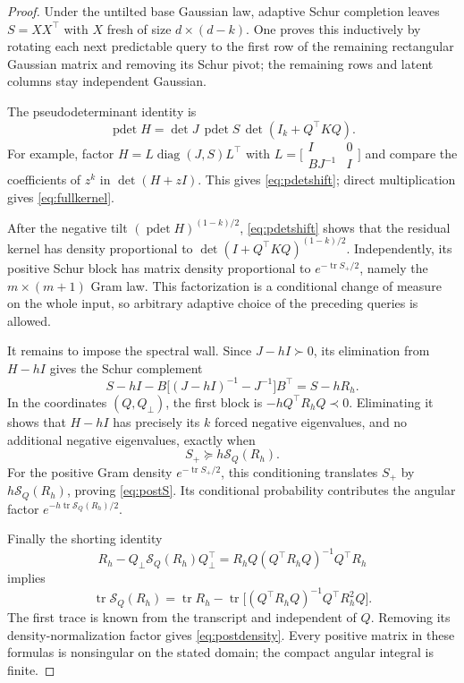 \documentclass[11pt]{article}
\theoremstyle{definition}
\newcommand{\tr}{\operatorname{tr}}
\newcommand{\diag}{\operatorname{diag}}
\newcommand{\pdet}{\operatorname{pdet}}
\begin{document}
\begin{proof}
Under the untilted base Gaussian law, adaptive Schur completion leaves $S=XX^\top$ with $X$ fresh of size $d\times(d-k)$. One proves this inductively by rotating each next predictable query to the first row of the remaining rectangular Gaussian matrix and removing its Schur pivot; the remaining rows and latent columns stay independent Gaussian.

The pseudodeterminant identity is
\begin{equation}\label{eq:pdetshift}
\pdet H=\det J\,\pdet S\,\det(I_k+Q^\top KQ).
\end{equation}
For example, factor $H=L\diag(J,S)L^\top$ with
$L=\bigl[\begin{smallmatrix}I&0\\BJ^{-1}&I\end{smallmatrix}\bigr]$ and compare the coefficients of $z^k$ in $\det(H+zI)$. This gives \eqref{eq:pdetshift}; direct multiplication gives \eqref{eq:fullkernel}.

After the negative tilt $(\pdet H)^{(1-k)/2}$, \eqref{eq:pdetshift} shows that the residual kernel has density proportional to $\det(I+Q^\top KQ)^{(1-k)/2}$. Independently, its positive Schur block has matrix density proportional to $e^{-\tr S_+/2}$, namely the $m\times(m+1)$ Gram law. This factorization is a conditional change of measure on the whole input, so arbitrary adaptive choice of the preceding queries is allowed.

It remains to impose the spectral wall. Since $J-hI\succ0$, its elimination from $H-hI$ gives the Schur complement
\[
S-hI-B\big[(J-hI)^{-1}-J^{-1}\big]B^\top=S-hR_h.
\]
In the coordinates $(Q,Q_\perp)$, the first block is $-hQ^\top R_hQ\prec0$. Eliminating it shows that $H-hI$ has precisely its $k$ forced negative eigenvalues, and no additional negative eigenvalues, exactly when
\[
S_+\succeq h\mathcal S_Q(R_h).
\]
For the positive Gram density $e^{-\tr S_+/2}$, this conditioning translates $S_+$ by $h\mathcal S_Q(R_h)$, proving \eqref{eq:postS}. Its conditional probability contributes the angular factor $e^{-h\tr\mathcal S_Q(R_h)/2}$.

Finally the shorting identity
\[
R_h-Q_\perp\mathcal S_Q(R_h)Q_\perp^\top
=R_hQ(Q^\top R_hQ)^{-1}Q^\top R_h
\]
implies
\[
\tr\mathcal S_Q(R_h)=\tr R_h-
\tr\big[(Q^\top R_hQ)^{-1}Q^\top R_h^2Q\big].
\]
The first trace is known from the transcript and independent of $Q$. Removing its density-normalization factor gives \eqref{eq:postdensity}. Every positive matrix in these formulas is nonsingular on the stated domain; the compact angular integral is finite.
\end{proof}
\end{document}
